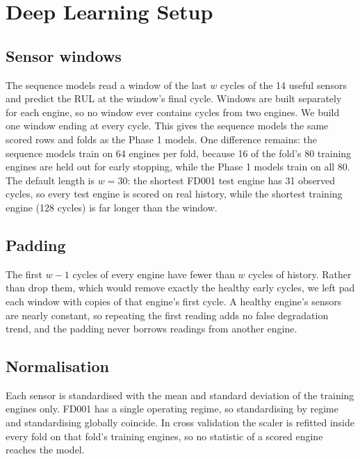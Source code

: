 \section{Deep Learning Setup}
\label{sec:dl-setup}

\subsection{Sensor windows}
The sequence models read a window of the last $w$ cycles of the 14 useful
sensors and predict the RUL at the window's final cycle. Windows are built
separately for each engine, so no window ever contains cycles from two
engines. We build one window ending at every cycle. This gives the sequence
models the same scored rows and folds as the Phase 1 models. One
difference remains: the sequence models train on 64 engines per fold, because
16 of the fold's 80 training engines are held out for early stopping, while
the Phase 1 models train on all 80. The default length
is $w = 30$: the shortest FD001 test engine has 31 observed cycles, so every
test engine is scored on real history, while the shortest training engine
(128 cycles) is far longer than the window.

\subsection{Padding}
The first $w-1$ cycles of every engine have fewer than $w$ cycles of history.
Rather than drop them, which would remove exactly the healthy early cycles,
we left pad each window with copies of that engine's first cycle. A healthy
engine's sensors are nearly constant, so repeating the first reading adds no
false degradation trend, and the padding never borrows readings from another
engine.

\subsection{Normalisation}
Each sensor is standardised with the mean and standard deviation of the
training engines only. FD001 has a single operating regime, so standardising
by regime and standardising globally coincide. In cross validation the scaler
is refitted inside every fold on that fold's training engines, so no
statistic of a scored engine reaches the model.

